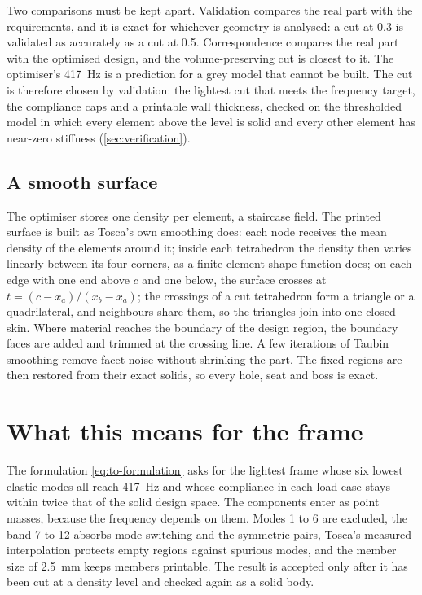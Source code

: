 Two comparisons must be kept apart. Validation compares the real part with the requirements, and it is exact for whichever geometry is analysed: a cut at 0.3 is validated as accurately as a cut at 0.5. Correspondence compares the real part with the optimised design, and the volume-preserving cut is closest to it. The optimiser's \SI{417}{Hz} is a prediction for a grey model that cannot be built. The cut is therefore chosen by validation: the lightest cut that meets the frequency target, the compliance caps and a printable wall thickness, checked on the thresholded model in which every element above the level is solid and every other element has near-zero stiffness (\cref{sec:verification}).

\subsection{A smooth surface}

The optimiser stores one density per element, a staircase field. The printed surface is built as Tosca's own smoothing does: each node receives the mean density of the elements around it; inside each tetrahedron the density then varies linearly between its four corners, as a finite-element shape function does; on each edge with one end above $c$ and one below, the surface crosses at $t = (c - x_a)/(x_b - x_a)$; the crossings of a cut tetrahedron form a triangle or a quadrilateral, and neighbours share them, so the triangles join into one closed skin. Where material reaches the boundary of the design region, the boundary faces are added and trimmed at the crossing line. A few iterations of Taubin smoothing remove facet noise without shrinking the part. The fixed regions are then restored from their exact solids, so every hole, seat and boss is exact.

\section{What this means for the frame}\label{sec:to-impact}

The formulation \eqref{eq:to-formulation} asks for the lightest frame whose six lowest elastic modes all reach \SI{417}{Hz} and whose compliance in each load case stays within twice that of the solid design space. The components enter as point masses, because the frequency depends on them. Modes 1 to 6 are excluded, the band 7 to 12 absorbs mode switching and the symmetric pairs, Tosca's measured interpolation protects empty regions against spurious modes, and the member size of \SI{2.5}{mm} keeps members printable. The result is accepted only after it has been cut at a density level and checked again as a solid body.
